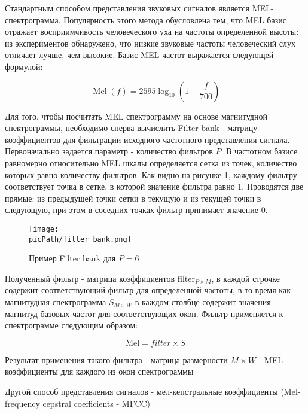 \documentclass[oneside,final,14pt]{extreport}
\newcommand{\picPath}{pictures}
\begin{document}
Стандартным способом представления звуковых сигналов  является MEL- спектрограмма\cite{bib:librosa}. Популярность этого метода обусловлена тем, что MEL базис отражает восприимчивость человеческого уха на частоты определенной высоты: из экспериментов обнаружено, что низкие звуковые частоты человеческий слух отличает лучше, чем высокие. Базис MEL частот выражается следующей формулой: 

$$
\begin{equation}
\operatorname{Mel}(f)=2595 \log _{10}\left(1+\frac{f}{700}\right)
\end{equation}
$$

Для того, чтобы посчитать MEL спектрограмму на основе магнитудной спектрограммы, необходимо сперва вычислить Filter bank - матрицу коэффициентов для фильтрации исходного частотного представления сигнала\cite{bib:librosa}. Первоначально задается параметр - количество фильтров $P$. В частотном базисе равномерно относительно MEL шкалы определяется сетка из точек, количество которых равно количеству фильтров. Как видно на рисунке \ref{pic:filter_bank}, каждому фильтру соответствует точка в сетке, в которой значение фильтра равно 1. Проводятся две прямые: из предыдущей точки сетки в текущую и из текущей точки в следующую, при этом в соседних точках фильтр принимает значение 0.


\begin{figure}[H]
\begin{center}
\texttt{[image: \\picPath/filter\_bank.png]}
\end{center}
  \caption{Пример Filter bank для $P = 6$}
  \label{pic:filter_bank}
  \end{figure}


Полученный фильтр - матрица коэффициентов  $\text{filter}_{P \times M}$, в каждой строчке содержит соответствующий фильтр для определенной частоты, в то время как  магнитудная спектрограмма $S_{M \times W }$ в каждом столбце содержит значения магнитуд базовых частот для соответствующих окон. Фильтр применяется к спектрограмме следующим образом:

$$
\begin{equation}
\text{Mel} = filter \times S
\end{equation}
$$

Результат применения такого фильтра -  матрица размерности $M \times W$ - MEL коэффициенты для каждого из окон спектрограммы


Другой способ представления сигналов - мел-кепстральные коэффициенты (Mel-frequency cepstral coefficients - MFCC)\cite{bib:librosa}\cite{bib:MFCC}\cite{bib:MFCC_choice}
\end{document}
